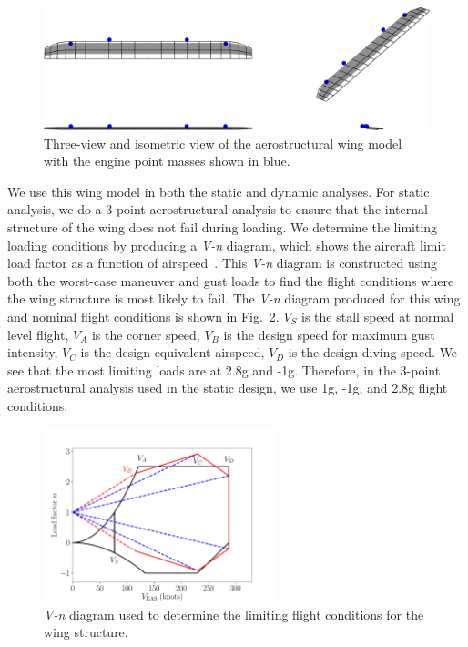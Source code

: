 \begin{figure}[h]
\begin{center}
 \includegraphics[width=1.0\textwidth]{../Images/aerostruct_wing}
 \caption{Three-view and isometric view of the aerostructural wing model with the engine point masses shown in blue.}
 \label{f:OAS_wing}
\end{center}
\end{figure}

We use this wing model in both the static and dynamic analyses.
For static analysis, we do a 3-point aerostructural analysis to ensure that the internal structure of the wing does not fail during loading.
We determine the limiting loading conditions by producing a \textit{V-n} diagram, which shows the aircraft limit load factor as a function of airspeed~\cite{Raymer2012}.
This \textit{V-n} diagram is constructed using both the worst-case maneuver and gust loads to find the flight conditions where the wing structure is most likely to fail.
The \textit{V-n} diagram produced for this wing and nominal flight conditions is shown in Fig.~\ref{f:v_n_diagram}.
$V_S$ is the stall speed at normal level flight, $V_A$ is the corner speed, $V_B$ is the design speed for maximum gust intensity, $V_C$ is the design equivalent airspeed, $V_D$ is the design diving speed.
We see that the most limiting loads are at 2.8g and -1g.
Therefore, in the 3-point aerostructural analysis used in the static design, we use 1g, -1g, and 2.8g flight conditions.

\begin{figure}
\begin{center}
 \includegraphics[width=0.6\textwidth]{../Images/v_n_diagram}
 \caption{\textit{V-n} diagram used to determine the limiting flight conditions for the wing structure.}
 \label{f:v_n_diagram}
\end{center}
\end{figure}

